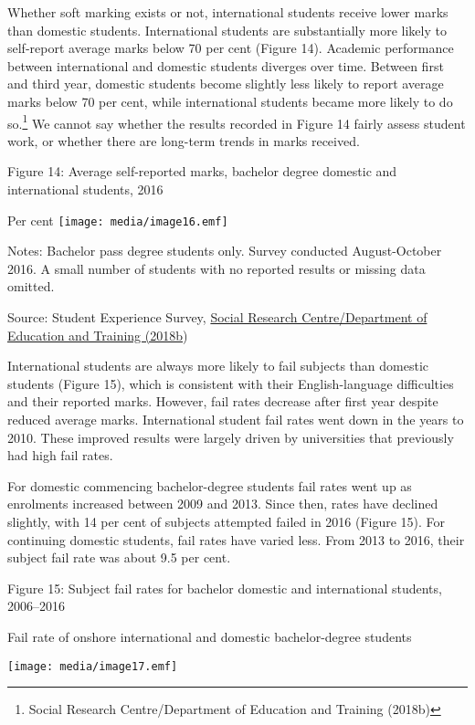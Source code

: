 \documentclass[]{book}
\begin{document}
Whether soft marking exists or not, international students receive lower marks than domestic students. International students are substantially more likely to self-report average marks below 70 per cent (Figure 14). Academic performance between international and domestic students diverges over time. Between first and third year, domestic students become slightly less likely to report average marks below 70 per cent, while international students became more likely to do so.\footnote{Social Research Centre/Department of Education and Training (2018b)} We cannot say whether the results recorded in Figure 14 fairly assess student work, or whether there are long-term trends in marks received.

\protect\hypertarget{_Ref520361736}{}{}Figure 14: Average self-reported marks, bachelor degree domestic and international students, 2016

Per cent \texttt{[image: media/image16.emf]}

Notes: Bachelor pass degree students only. Survey conducted August-October 2016. A small number of students with no reported results or missing data omitted.

Source: Student Experience Survey, \protect\hyperlink{_ENREF_191}{Social Research Centre/Department of Education and Training (2018b})

International students are always more likely to fail subjects than domestic students (Figure 15), which is consistent with their English-language difficulties and their reported marks. However, fail rates decrease after first year despite reduced average marks. International student fail rates went down in the years to 2010. These improved results were largely driven by universities that previously had high fail rates.

For domestic commencing bachelor-degree students fail rates went up as enrolments increased between 2009 and 2013. Since then, rates have declined slightly, with 14 per cent of subjects attempted failed in 2016 (Figure 15). For continuing domestic students, fail rates have varied less. From 2013 to 2016, their subject fail rate was about 9.5 per cent.

\protect\hypertarget{_Ref520361791}{}{}Figure 15: Subject fail rates for bachelor domestic and international students, 2006--2016

Fail rate of onshore international and domestic bachelor-degree students

\texttt{[image: media/image17.emf]}
\end{document}
